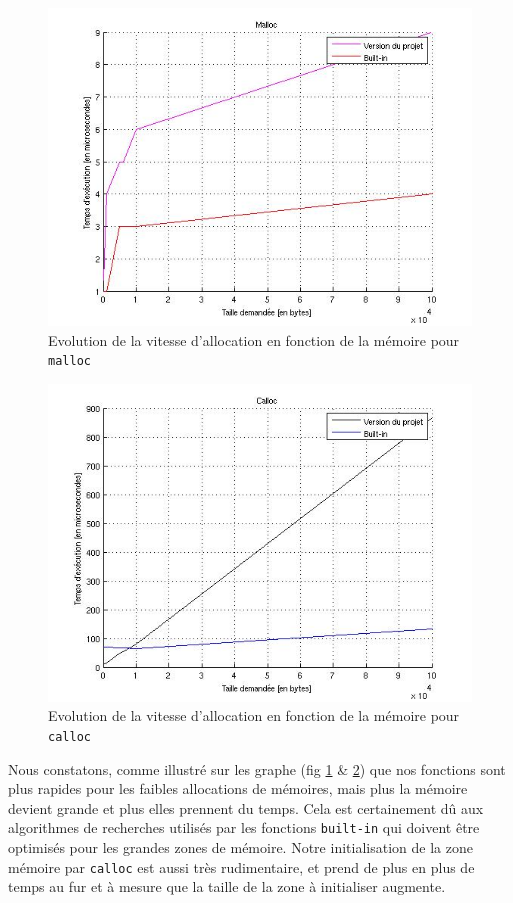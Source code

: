 \documentclass[10pt,a4paper]{article}
\begin{document}
\begin{figure}
\centering

  \includegraphics[width=1\linewidth]{graphe_malloc.jpg}
	\caption{Evolution de la vitesse d'allocation en fonction de la mémoire pour \texttt{malloc}}
  \label{fig1}
\end{figure}
\begin{figure}
  \centering
  \includegraphics[width=1\linewidth]{graphe_calloc.jpg}
  \caption{Evolution de la vitesse d'allocation en fonction de la mémoire pour  \texttt{calloc}}
\label{fig2}
\end{figure}

Nous constatons, comme illustré sur les graphe (fig \ref{fig1} \& \ref{fig2}) que nos fonctions sont plus rapides pour les faibles allocations de mémoires, mais plus la mémoire devient grande et plus elles prennent du temps. Cela est certainement dû aux algorithmes de recherches utilisés par les fonctions \texttt{built-in} qui doivent être optimisés pour les grandes zones de mémoire. Notre initialisation de la zone mémoire par \texttt{calloc} est aussi très rudimentaire, et prend de plus en plus de temps au fur et à mesure que la taille de la zone à initialiser augmente.
\end{document}
